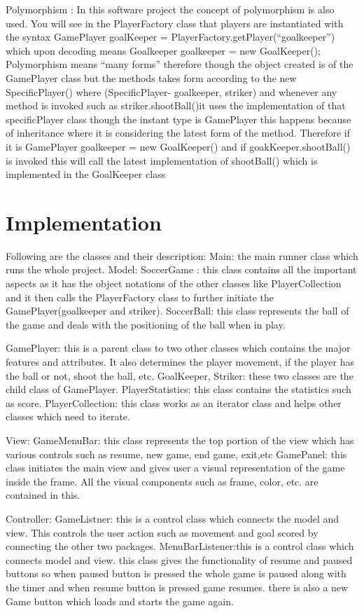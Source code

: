 \documentclass[12pt, dvipsnames, a4paper]{article}
\begin{document}
Polymorphism : In this software project the concept of polymorphism is also used. You will see in the PlayerFactory class that 
players are instantiated with the syntax GamePlayer goalKeeper = PlayerFactory.getPlayer(“goalkeeper”) which upon decoding means Goalkeeper goalkeeper = new GoalKeeper(); 
Polymorphism means “many forms” therefore though the object created is of the GamePlayer class but the methods takes form according to the new SpecificPlayer() where (SpecificPlayer- goalkeeper, striker) 
and whenever any method is invoked such as striker.shootBall()it uses the implementation of that specificPlayer class though the
 instant type is GamePlayer this happens because of inheritance where it is considering the latest form of the method. 
Therefore if it is GamePlayer goalkeeper =  new GoalKeeper() and if goakKeeper.shootBall() is invoked this will call the
 latest implementation of shootBall() which is implemented in the GoalKeeper class


\section{Implementation}
Following are the classes and their description:
Main: the main runner class which runs the whole project.
Model: 
SoccerGame : this class contains all the important aspects as it has the object notations of the other classes like PlayerCollection and it then calls the PlayerFactory class to further initiate the GamePlayer(goalkeeper and striker). 
SoccerBall: this class represents the ball of the game and deals with the positioning of the ball when in play.

GamePlayer: this is a parent class to two other classes which contains the major features and attributes. It also determines the player movement, if the player has the ball or not, shoot the ball, etc.
GoalKeeper, Striker: these two classes are the child class of GamePlayer. 
PlayerStatistics: this class contains the statistics such as score.
PlayerCollection: this class works as an iterator class and helps other classes which need to iterate.
 
View: 
GameMenuBar: this class represents the top portion of the view which has various controls such as resume, new game, end game, exit,etc
GamePanel: this class initiates the main view and gives user a visual representation of the game inside the frame. All the visual components such as frame, color, etc. are contained in this.   

Controller:
GameListner: this is a control class which connects the model and view. This controls the user action such as movement and goal scored by connecting the other two packages.
MenuBarListener:this is a control class which connects model and view. this class gives the functionality of resume and paused buttons so when paused button is pressed the whole game is paused along with the timer and when resume button is pressed game resumes. there is also a new Game button which loads and starts the game again.
\end{document}
